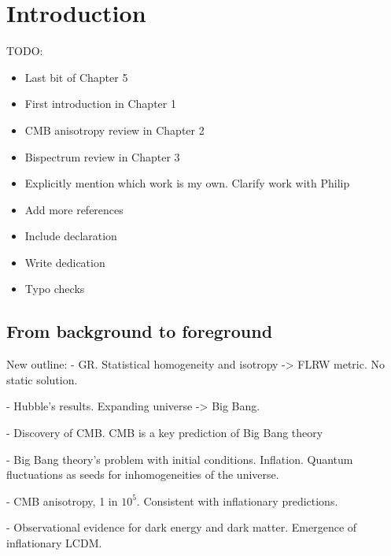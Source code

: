 
\chapter{Introduction} \label{chapter:introduction}

\ifpdf
    \graphicspath{{Chapter1/Figs/Raster/}{Chapter1/Figs/PDF/}{Chapter1/Figs/}}
\else
    \graphicspath{{Chapter1/Figs/Vector/}{Chapter1/Figs/}}
\fi

TODO:
\begin{itemize}
	\item Last bit of Chapter 5
	\item First introduction in Chapter 1
	\item CMB anisotropy review in Chapter 2
	\item Bispectrum review in Chapter 3
	\item Explicitly mention which work is my own. Clarify work with Philip
	\item Add more references
	\item Include declaration
	\item Write dedication
	\item Typo checks
\end{itemize}


\section{From background to foreground}

New outline:
- GR. Statistical homogeneity and isotropy -> FLRW metric. No static solution.

- Hubble's results. Expanding universe -> Big Bang.

- Discovery of CMB. CMB is a key prediction of Big Bang theory

- Big Bang theory's problem with initial conditions. Inflation. Quantum fluctuations as seeds for inhomogeneities of the universe.

- CMB anisotropy, 1 in $10^5$. Consistent with inflationary predictions.

- Observational evidence for dark energy and dark matter. Emergence of inflationary LCDM.

